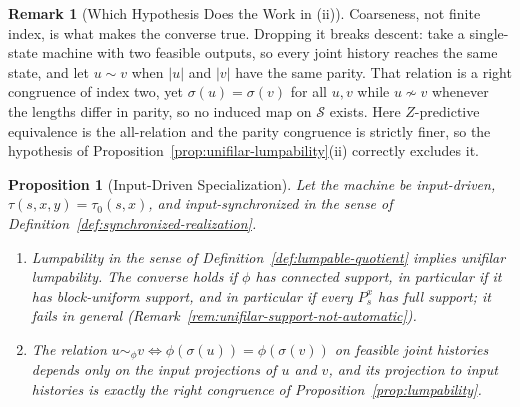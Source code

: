 \documentclass[12pt]{article}
\newtheorem{proposition}[theorem]{Proposition}
\theoremstyle{definition}
\newtheorem{remark}[theorem]{Remark}
\begin{document}
\begin{remark}[Which Hypothesis Does the Work in (ii)]
\label{rem:unifilar-converse-hypothesis}
Coarseness, not finite index, is what makes the converse true.  Dropping it
breaks descent: take a single-state machine with two feasible outputs, so
every joint history reaches the same state, and let $u\sim v$ when $|u|$ and
$|v|$ have the same parity.  That relation is a right congruence of index two,
yet $\sigma(u)=\sigma(v)$ for all $u,v$ while $u\not\sim v$ whenever the
lengths differ in parity, so no induced map on $\mathcal S$ exists.  Here
$Z$-predictive equivalence is the all-relation and the parity congruence is
strictly finer, so the hypothesis of Proposition~\ref{prop:unifilar-lumpability}(ii)
correctly excludes it.
\end{remark}

\begin{proposition}[Input-Driven Specialization]
\label{prop:input-driven-specialization}
Let the machine be input-driven, $\tau(s,x,y)=\tau_0(s,x)$, and
input-synchronized in the sense of
Definition~\ref{def:synchronized-realization}.
\begin{enumerate}[label=(\roman*)]
\item Lumpability in the sense of Definition~\ref{def:lumpable-quotient}
implies unifilar lumpability.  The converse holds if $\phi$ has connected
support, in particular if it has block-uniform support, and in particular if
every $P_s^x$ has full support; it fails in general
(Remark~\ref{rem:unifilar-support-not-automatic}).
\item The relation $u\sim_\phi v\iff\phi(\sigma(u))=\phi(\sigma(v))$ on
feasible joint histories depends only on the input projections of $u$ and $v$,
and its projection to input histories is exactly the right congruence of
Proposition~\ref{prop:lumpability}.
\end{enumerate}
\end{proposition}
\end{document}

